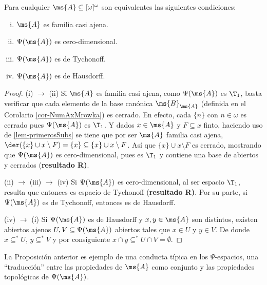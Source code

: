 	\begin{proposicion}\label{prop-tra-casiAjenidad}
		Para cualquier $\ms{A}\subseteq [\omega]^\omega$ son equivalentes las siguientes condiciones:
		\begin{enumerate}[i)]
			\item $\ms{A}$ es familia casi ajena.
			\item $\Psi(\ms{A})$ es cero-dimensional.
			\item $\Psi(\ms{A})$ es de Tychonoff.
			\item $\Psi(\ms{A})$ es de Hausdorff.
		\end{enumerate}
	\end{proposicion}
	
	\begin{proof} 
		(i) $\rightarrow$ (ii) Si $\ms{A}$ es familia casi ajena, como $\Psi(\ms{A})$ es $\T_1$, basta verificar que cada elemento de la base canónica $\ms{B}_\ms{A}$ (definida en el Corolario \ref{cor-NumAxMrowka}) es cerrado. En efecto, cada $\{n\}$ con $n \in \omega$ es cerrado pues $\Psi(\ms{A})$ es $\T_1$. Y dados $x \in \ms{A}$ y $F \subseteq x$ finto, haciendo uso de \ref{lem-primerosSubs} se tiene que por ser $\ms{A}$ familia casi ajena, $\der(\{x\} \cup x \setminus F)=\{x\} \subseteq \{x\} \cup x \setminus F$. Así que $\{x\} \cup x \setminus F$ es cerrado, mostrando que $\Psi(\ms{A})$ es cero-dimensional, pues es $\T_1$ y contiene una base de abiertos y cerrados (\textbf{resultado R)}.
	
		(ii) $\rightarrow$ (iii) $\rightarrow$ (iv) Si $\Psi(\ms{A})$ es cero-dimensional, al ser espacio $\T_1$, resulta que entonces es espacio de Tychonoff (\textbf{resultado R)}. Por su parte, si $\Psi(\ms{A})$ es de Tychonoff, entonces es de Hausdorff.
		
		(iv) $\rightarrow$ (i) Si $\Psi(\ms{A})$ es de Hausdorff y $x,y \in \ms{A}$ son distintos, existen abiertos ajenos $U,V \subseteq \Psi(\ms{A})$ abiertos tales que $x \in U$ y $y \in V$. De donde $x \subseteq^* U$, $y \subseteq^* V$ y por consiguiente $x \cap y \subseteq^* U \cap V = \emptyset$.
	\end{proof}
	
	La Proposición anterior es ejemplo de una conducta típica en los $\Psi$-espacios, una ``traducción'' entre las propiedades de $\ms{A}$ como conjunto y las propiedades topológicas de $\Psi(\ms{A})$.

